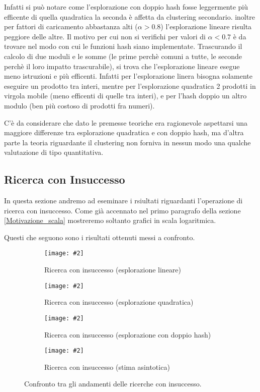 \documentclass{article}
\newcommand{\image}[3][1]{
	\centering
	\texttt{[image: \#2]}
	\caption{#3}
}
\begin{document}
Infatti si può notare come l'esplorazione con doppio hash fosse leggermente più efficente di quella quadratica la seconda è affetta da clustering secondario. inoltre per fattori di caricamento abbastanza alti ($\alpha > 0.8$) l'esplorazione lineare risulta peggiore delle altre. Il motivo per cui non si verifichi per valori di $\alpha < 0.7$ è da trovare nel modo con cui le funzioni hash siano implementate. Trascurando il calcolo di due moduli e le somme (le prime perchè comuni a tutte, le seconde perchè il loro impatto trascurabile), si trova che l'esplorazione lineare esegue meno istruzioni e più efficenti. Infatti per l'esplorazione linera bisogna solamente eseguire un prodotto tra interi, mentre per l'esplorazione quadratica 2 prodotti in virgola mobile (meno efficenti di quelle tra interi), e per l'hash doppio un altro modulo (ben più costoso di prodotti fra numeri).

C'è da considerare che dato le premesse teoriche era ragionevole aspettarsi una maggiore differenze tra esplorazione quadratica e con doppio hash, ma d'altra parte la teoria riguardante il clustering non forniva in nessun modo una qualche valutazione di tipo quantitativa.

\subsection{Ricerca con Insuccesso}
In questa sezione andremo ad eseminare i rsiultati riguardanti l'operazione di ricerca con insuccesso. Come già accennato nel primo paragrafo della sezione \ref{Motivazione_scala} mostreremo soltanto grafici in scala logaritmica.

Questi che seguono sono i risultati ottenuti messi a confronto.
\begin{figure}[H]
\begin{subfigure}[b]{0.5\textwidth}
\image{Insuccesso_Lineare_scala_logaritmica}{Ricerca con insuccesso (esplorazione lineare)}
\end{subfigure}
\begin{subfigure}[b]{0.5\textwidth}
\image{Insuccesso_Quadratico_scala_logaritmica}{Ricerca con insuccesso (esplorazione quadratica)}
\end{subfigure}
\begin{subfigure}[b]{0.5\textwidth}
\image{Insuccesso_Doppio_scala_logaritmica}{Ricerca con insuccesso (esplorazione con doppio hash)}
\end{subfigure}
\begin{subfigure}[b]{0.5\textwidth}
\image{Insuccesso_Asintotica_scala_logaritmica}{Ricerca con insuccesso (stima asintotica)}
\end{subfigure}
\caption{Confronto tra gli andamenti delle ricerche con insuccesso.}
\label{fig:Insuccesso_quartetto}
\end{figure}
\end{document}
